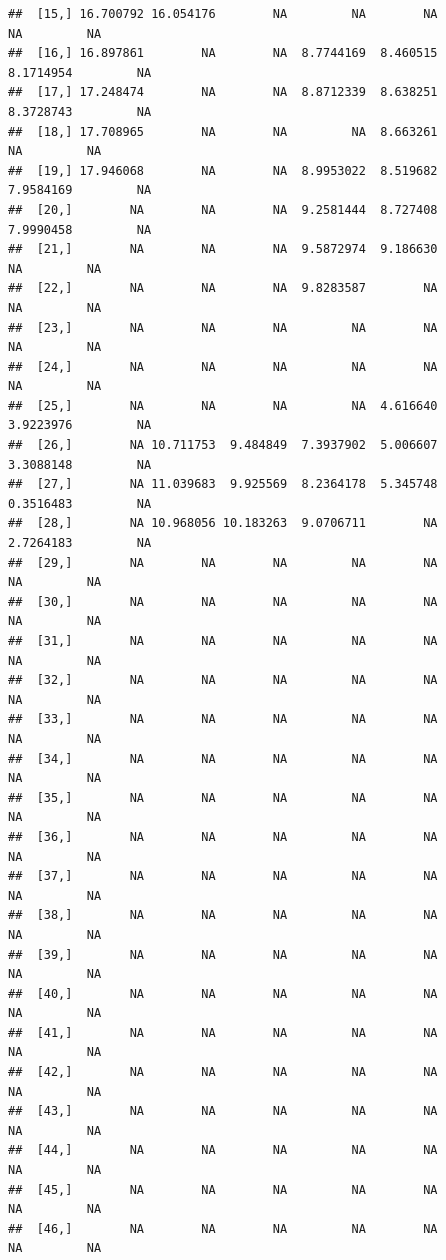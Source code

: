 \documentclass{article}\usepackage[]{graphicx}\usepackage[]{color}
\makeatletter
\newenvironment{kframe}{%
 \def\at@end@of@kframe{}%
 \ifinner\ifhmode%
  \def\at@end@of@kframe{\end{minipage}}%
  \begin{minipage}{\columnwidth}%
 \fi\fi%
 \def\FrameCommand##1{\hskip\@totalleftmargin \hskip-\fboxsep
 \colorbox{shadecolor}{##1}\hskip-\fboxsep
     \hskip-\linewidth \hskip-\@totalleftmargin \hskip\columnwidth}%
 \MakeFramed {\advance\hsize-\width
   \@totalleftmargin\z@ \linewidth\hsize
   \@setminipage}}%
 {\par\unskip\endMakeFramed%
 \at@end@of@kframe}
\newenvironment{knitrout}{}{} %
\makeatother
\begin{document}
\begin{knitrout}
\begin{kframe}
\begin{verbatim}
##  [15,] 16.700792 16.054176        NA         NA        NA         NA         NA
##  [16,] 16.897861        NA        NA  8.7744169  8.460515  8.1714954         NA
##  [17,] 17.248474        NA        NA  8.8712339  8.638251  8.3728743         NA
##  [18,] 17.708965        NA        NA         NA  8.663261         NA         NA
##  [19,] 17.946068        NA        NA  8.9953022  8.519682  7.9584169         NA
##  [20,]        NA        NA        NA  9.2581444  8.727408  7.9990458         NA
##  [21,]        NA        NA        NA  9.5872974  9.186630         NA         NA
##  [22,]        NA        NA        NA  9.8283587        NA         NA         NA
##  [23,]        NA        NA        NA         NA        NA         NA         NA
##  [24,]        NA        NA        NA         NA        NA         NA         NA
##  [25,]        NA        NA        NA         NA  4.616640  3.9223976         NA
##  [26,]        NA 10.711753  9.484849  7.3937902  5.006607  3.3088148         NA
##  [27,]        NA 11.039683  9.925569  8.2364178  5.345748  0.3516483         NA
##  [28,]        NA 10.968056 10.183263  9.0706711        NA  2.7264183         NA
##  [29,]        NA        NA        NA         NA        NA         NA         NA
##  [30,]        NA        NA        NA         NA        NA         NA         NA
##  [31,]        NA        NA        NA         NA        NA         NA         NA
##  [32,]        NA        NA        NA         NA        NA         NA         NA
##  [33,]        NA        NA        NA         NA        NA         NA         NA
##  [34,]        NA        NA        NA         NA        NA         NA         NA
##  [35,]        NA        NA        NA         NA        NA         NA         NA
##  [36,]        NA        NA        NA         NA        NA         NA         NA
##  [37,]        NA        NA        NA         NA        NA         NA         NA
##  [38,]        NA        NA        NA         NA        NA         NA         NA
##  [39,]        NA        NA        NA         NA        NA         NA         NA
##  [40,]        NA        NA        NA         NA        NA         NA         NA
##  [41,]        NA        NA        NA         NA        NA         NA         NA
##  [42,]        NA        NA        NA         NA        NA         NA         NA
##  [43,]        NA        NA        NA         NA        NA         NA         NA
##  [44,]        NA        NA        NA         NA        NA         NA         NA
##  [45,]        NA        NA        NA         NA        NA         NA         NA
##  [46,]        NA        NA        NA         NA        NA         NA         NA

\end{verbatim}
\end{kframe}
\end{knitrout}
\end{document}
